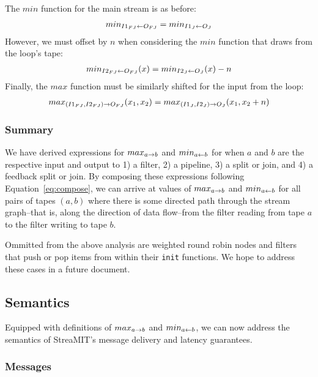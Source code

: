 The $min$ function for the main stream is as before:
\begin{align*}
min_{I1_{FJ} \leftarrow O_{FJ}} = min_{I1_J \leftarrow O_J} 
\end{align*}
However, we must offset by $n$ when considering the $min$ function
that draws from the loop's tape:
\begin{align*}
min_{I2_{FJ} \leftarrow O_{FJ}}(x) = min_{I2_J \leftarrow O_J}(x) - n
\end{align*}
Finally, the $max$ function must be similarly shifted for the input
from the loop:
\begin{align*}
max_{(I1_{FJ}, I2_{FJ}) \rightarrow O_{FJ}}(x_1, x_2) = max_{(I1_J, I2_J) \rightarrow O_J}(x_1,
x_2 + n)
\end{align*}

\subsubsection{Summary}

We have derived expressions for $max_{a \rightarrow b}$ and $min_{a \leftarrow b}$ for when
$a$ and $b$ are the respective input and output to 1) a filter, 2) a
pipeline, 3) a split or join, and 4) a feedback split or join.  By
composing these expressions following Equation~\ref{eq:compose}, we
can arrive at values of $max_{a \rightarrow b}$ and $min_{a \leftarrow b}$ for all pairs of
tapes $(a, b)$ where there is some directed path through the stream
graph--that is, along the direction of data flow--from the filter
reading from tape $a$ to the filter writing to tape $b$.  

Ommitted from the above analysis are weighted round robin nodes and
filters that push or pop items from within their {\tt init} functions.
We hope to address these cases in a future document.

\subsection{Semantics}

Equipped with definitions of $max_{a \rightarrow b}$ and $min_{a \leftarrow b}$, we can now
address the semantics of StreaMIT's message delivery and latency
guarantees.

\subsubsection{Messages}

